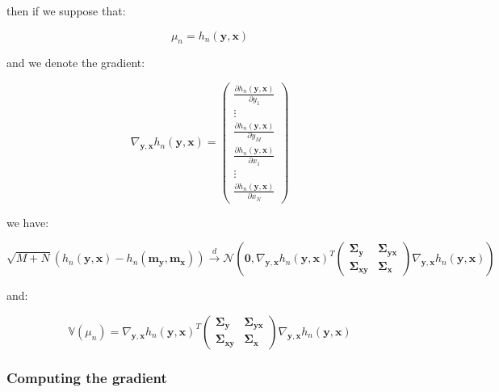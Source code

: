\documentclass{tex/note}
\begin{document}
then if we suppose that:

\begin{equation*}
\mu_n = h_n \left( \bm{y} , \bm{x} \right)
\end{equation*}

and we denote the gradient:

\begin{equation*}
\nabla_{\bm{y} , \bm{x}} h_n \left( \bm{y} , \bm{x} \right) = \begin{pmatrix} \frac{\partial h_n \left( \bm{y} , \bm{x} \right)}{\partial y_1} \\ \vdots \\ \frac{\partial h_n \left( \bm{y} , \bm{x} \right)}{\partial y_M} \\ \frac{\partial h_n \left( \bm{y} , \bm{x} \right)}{\partial x_1} \\ \vdots \\ \frac{\partial h_n \left( \bm{y} , \bm{x} \right)}{\partial x_N} \end{pmatrix}
\end{equation*}

we have:

\begin{equation*}
\sqrt{M + N} \left( h_n \left( \bm{y} , \bm{x} \right) - h_n \left( \bm{m}_{\bm{y}} , \bm{m}_{\bm{x}} \right) \right) \xrightarrow[]{d} \mathcal{N} \left( \bm{0} , \nabla_{\bm{y} , \bm{x}} h_n \left( \bm{y} , \bm{x} \right)^T \begin{pmatrix} \bm{\Sigma}_{\bm{y}} & \bm{\Sigma}_{\bm{y} \bm{x}} \\ \bm{\Sigma}_{\bm{x} \bm{y}} & \bm{\Sigma}_{\bm{x}} \end{pmatrix} \nabla_{\bm{y} , \bm{x}} h_n \left( \bm{y} , \bm{x} \right) \right)
\end{equation*}

and:

\begin{equation*}
\mathbb{V} \left( \mu_n \right) = \nabla_{\bm{y} , \bm{x}} h_n \left( \bm{y} , \bm{x} \right)^T \begin{pmatrix} \bm{\Sigma}_{\bm{y}} & \bm{\Sigma}_{\bm{y} \bm{x}} \\ \bm{\Sigma}_{\bm{x} \bm{y}} & \bm{\Sigma}_{\bm{x}} \end{pmatrix} \nabla_{\bm{y} , \bm{x}} h_n \left( \bm{y} , \bm{x} \right)
\end{equation*}

\subsubsection{Computing the gradient}
\end{document}
